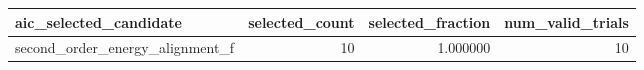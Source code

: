 \begin{tabular}{lrrr}
\toprule
aic_selected_candidate & selected_count & selected_fraction & num_valid_trials \\
\midrule
second_order_energy_alignment_f & 10 & 1.000000 & 10 \\
\bottomrule
\end{tabular}

